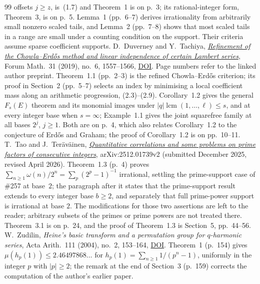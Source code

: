 \documentclass[11pt]{article}
\theoremstyle{plain}
\theoremstyle{definition}
\theoremstyle{remark}
\begin{document}
\begin{thebibliography}{99}
  offsets $j\ge z$, is~(1.7) and Theorem~1 is on p.~3; its rational-integer
  form, Theorem~3, is on p.~5.  Lemma~1 (pp.~6--7) derives irrationality from
  arbitrarily small nonzero scaled tails, and Lemma~2 (pp.~7--8) shows that
  most scaled tails in a range are small under a counting condition on the
  support.  Their criteria assume sparse coefficient supports.
 D.~Duverney and Y.~Tachiya,
  \href{https://danielduverney.fr/documents/theorie-des-nombres/DuverneyTachiya190522.pdf}
  {\emph{Refinement of the Chowla--Erd\H{o}s method and linear independence
  of certain Lambert series}},
  Forum Math.\ 31 (2019), no.~6, 1557--1566,
  \href{https://doi.org/10.1515/forum-2018-0299}{DOI}.  Page numbers refer to
  the linked author preprint.  Theorem~1.1 (pp.~2--3) is the refined
  Chowla--Erd\H{o}s criterion; its proof in Section~2 (pp.~5--7) selects an
  index by minimising a local coefficient mass along an arithmetic
  progression, (2.3)--(2.9).  Corollary~1.2 gives the general $F_s(E)$
  theorem and its monomial images under $|q|\operatorname{lcm}(1,\dots,\ell)\le s$, and at
  every integer base when $s=\infty$; Example~1.1 gives the joint squarefree
  family at all bases \(2^j\), \(j\ge1\).  Both are on p.~4, which also
  relates Corollary~1.2 to the conjecture of Erd\H{o}s and Graham; the proof
  of Corollary~1.2 is on pp.~10--11.
 T.~Tao and J.~Ter\"av\"ainen,
  \href{https://arxiv.org/abs/2512.01739v2}{\emph{Quantitative correlations and
  some problems on prime factors of consecutive integers}}, arXiv:2512.01739v2
  (submitted December 2025, revised April 2026).  Theorem~1.3 (p.~4) proves
  $\sum_{n\ge1}\omega(n)/2^n=\sum_p(2^p-1)^{-1}$ irrational, settling the
  prime-support case of \#257 at base~$2$; the paragraph after it states that
  the prime-support result extends to every integer base $b\ge2$, and
  separately that full prime-power support is irrational at base $2$.
  The modifications for those two assertions are left to the reader;
  arbitrary subsets of the primes or prime powers are not treated there.  Theorem~3.1 is on p.~24, and the
  proof of Theorem~1.3 is Section~5, pp.~44--56.
 W.~Zudilin, \emph{Heine's basic transform and a
  permutation group for $q$-harmonic series}, Acta Arith.\ 111 (2004), no.~2,
  153--164, \href{https://doi.org/10.4064/aa111-2-4}{DOI}.  Theorem~1 (p.~154)
  gives $\mu(h_p(1))\le2.46497868\ldots$ for $h_p(1)=\sum_{n\ge1}1/(p^n-1)$,
  uniformly in the integer $p$ with $|p|\ge2$; the remark at the end of
  Section~3 (p.~159) corrects the computation of the author's earlier paper.

\end{thebibliography}
\end{document}
